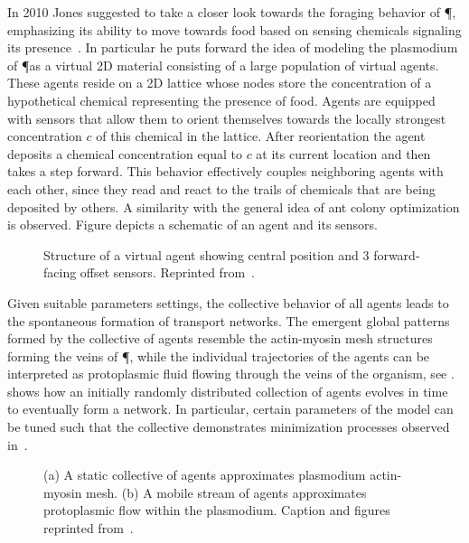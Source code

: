 			In 2010 Jones suggested to take a closer look towards the foraging behavior of \P, emphasizing its ability to move towards food based on sensing chemicals signaling its presence~\cite{jones2010characteristics}. In particular he puts forward the idea of modeling the plasmodium of \P as a virtual 2D material consisting of a large population of virtual agents. These agents reside on a 2D lattice whose nodes store the concentration of a hypothetical chemical representing the presence of food. Agents are equipped with sensors that allow them to orient themselves towards the locally strongest concentration $c$ of this chemical in the lattice. After reorientation the agent deposits a chemical concentration equal to $c$ at its current location and then takes a step forward. This behavior effectively couples neighboring agents with each other, since they read and react to the trails of chemicals that are being deposited by others. A similarity with the general idea of ant colony optimization is observed. Figure  depicts a schematic of an agent and its sensors.

			\begin{figure}
				\centering
				
				\caption[Multi-agent \P \ - Agent schematic]{Structure of a virtual agent showing central position and $3$ forward-facing offset sensors. Reprinted from~\cite{jones2010characteristics}.}
				\label{fig:agent}
			\end{figure}

			Given suitable parameters settings, the collective behavior of all agents leads to the spontaneous formation of transport networks. The emergent global patterns formed by the collective of agents resemble the actin-myosin mesh structures forming the veins of \P, while the individual trajectories of the agents can be interpreted as protoplasmic fluid flowing through the veins of the organism, see .  shows how an initially randomly distributed collection of agents evolves in time to eventually form a network. In particular, certain parameters of the model can be tuned such that the collective demonstrates minimization processes observed in~\cite{jones2011influences,jones2015applications,baumgarten2015network}. 

			\begin{figure}
				\centering
				
				\caption[Multi-agent \P \ - Collective behavior of agents]{(a) A static collective of agents approximates plasmodium actin-myosin mesh. (b) A mobile stream of agents approximates protoplasmic flow within the plasmodium. Caption and figures reprinted from~\cite{jones2010characteristics}.}
				\label{fig:agent_structures}
			\end{figure}


